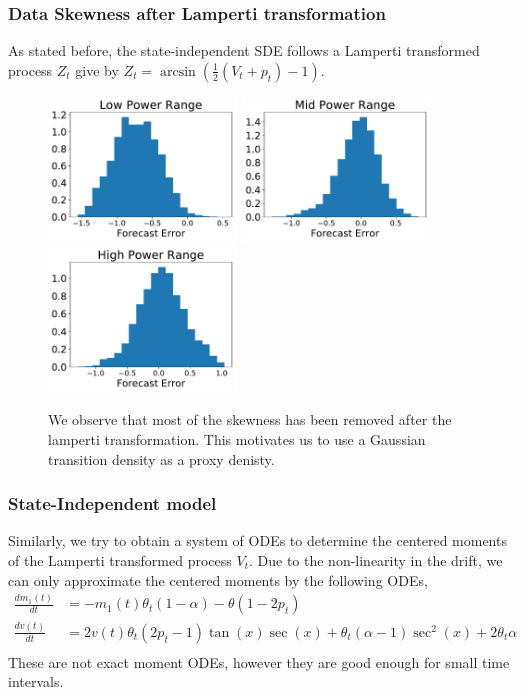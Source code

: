 \documentclass[aspectratio=169]{beamer}\usepackage[utf8]{inputenc}
\begin{document}
\begin{frame}\frametitle{Data Skewness after Lamperti transformation}
As stated before, the state-independent SDE follows a Lamperti transformed process $Z_t$ give by $Z_t = \arcsin \left( \frac{1}{2} \left( V_t+p_t \right) - 1 \right) $.
\begin{figure}
  \includegraphics[width=50mm,scale=1]{plots/hist_low_lamperti.pdf}
  \includegraphics[width=50mm,scale=1]{plots/hist_mid_lamperti.pdf}
  \includegraphics[width=50mm,scale=1]{plots/hist_high_lamperti.pdf}
  \caption{We observe that most of the skewness has been removed after the lamperti transformation. This motivates us to use a Gaussian transition density as a proxy denisty.}
\end{figure}
\end{frame}

\begin{frame}\frametitle{State-Independent model}
Similarly, we try to obtain a system of ODEs to determine the centered moments of the Lamperti transformed process $V_t$. Due to the non-linearity in the drift, we can only approximate the centered moments by the following ODEs,
\begin{equation}
\begin{split}
\frac{d m_1 (t)}{dt} &= - m_1(t)\theta_t (1-\alpha) - \theta (1-2 p_t) \\
\frac{d v(t)}{dt} &=  2 v(t) \theta_t (2p_t - 1 ) \tan(x) \sec(x) + \theta_t (\alpha - 1) \sec^2(x)  + 2 \theta_t \alpha\\
\end{split}
\end{equation}
These are not exact moment ODEs, however they are good enough for small time intervals.
\end{frame}
\end{document}
